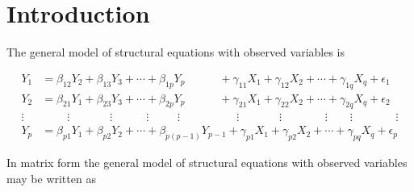 \hypertarget{introduction-2}{%
\section{Introduction}\label{introduction-2}}

The general model of structural equations with observed variables is

\scriptsize

\begin{align*}
Y_{1} & =\beta_{12}Y_{2}+\beta_{13}Y_{3}+\cdots+\beta_{1p}Y_{p}\qquad\quad+\gamma_{11}X_{1}+\gamma_{12}X_{2}+\cdots+\gamma_{1q}X_{q}+\epsilon_{1}\\
Y_{2} & =\beta_{21}Y_{1}+\beta_{23}Y_{3}+\cdots+\beta_{2p}Y_{p}\qquad\quad+\gamma_{21}X_{1}+\gamma_{22}X_{2}+\cdots+\gamma_{2q}X_{q}+\epsilon_{2}\\
\vdots & \;\qquad\vdots\qquad\quad\;\;\vdots\qquad\quad\vdots\qquad\;\;\vdots\qquad\qquad\quad\vdots\qquad\quad\;\;\vdots\qquad\quad\;\;\;\vdots\qquad\vdots\qquad\quad\;\;\;\vdots\\
Y_{p} & =\beta_{p1}Y_{1}+\beta_{p2}Y_{2}+\cdots+\beta_{p\left(p-1\right)}Y_{p-1}+\gamma_{p1}X_{1}+\gamma_{p2}X_{2}+\cdots+\gamma_{pq}X_{q}+\epsilon_{p}
\end{align*}

\normalsize

In matrix form the general model of structural equations with observed variables may be written as

\scriptsize

